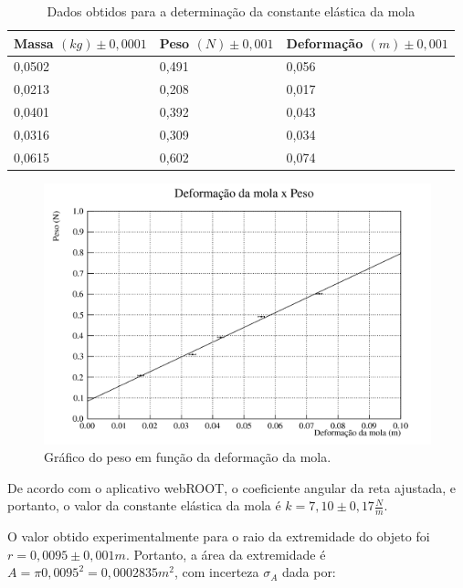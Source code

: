 \documentclass[12pt]{article}
\begin{document}
		\begin{table}[H]
			\centering
			\begin{tabular}{|l|l|l|}
				\hline
				Massa $(kg) \pm 0,0001$ & Peso $(N) \pm 0,001$ & Deformação $(m) \pm 0,001$ \\ \hline
				0,0502              & 0,491             & 0,056                 \\ \hline
				0,0213              & 0,208             & 0,017                 \\ \hline
				0,0401              & 0,392             & 0,043                 \\ \hline
				0,0316              & 0,309             & 0,034                 \\ \hline
				0,0615              & 0,602             & 0,074                 \\ \hline
			\end{tabular}
			\caption{Dados obtidos para a determinação da constante elástica da mola
			}
			\label{tab:table1}
		\end{table}
		
		\begin{figure}[H]
			\centering
			\includegraphics[width=15cm]{grafico_1.png}
			\caption{Gráfico do peso em função da deformação da mola.}
			\label{graf:grafico1}
		\end{figure}
		
		De acordo com o aplicativo webROOT, o coeficiente angular da reta ajustada, e portanto, o valor da constante elástica da mola é $k=7,10 \pm 0,17 \frac{N}{m}$.
		
		O valor obtido experimentalmente para o raio da extremidade do objeto foi $r=0,0095 \pm 0,001 m$. Portanto, a área da extremidade é $A=\pi 0,0095^2 = 0,0002835 m^2$, com incerteza $\sigma_A$ dada por:
		
\end{document}
